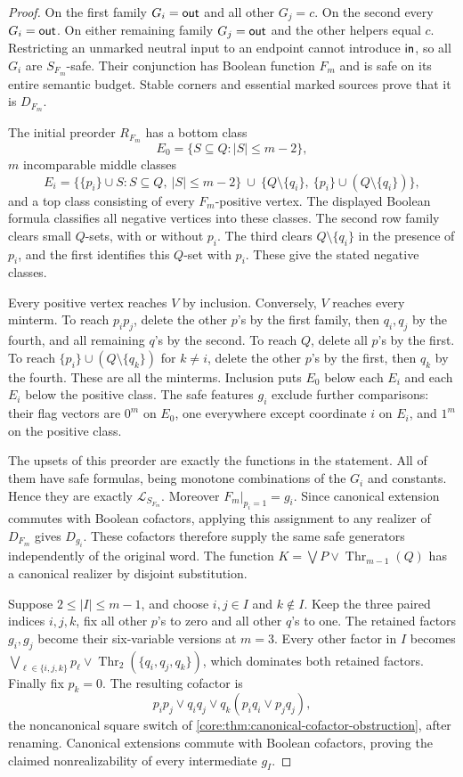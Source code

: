 \begin{proof}
On the first family $G_i=\mathsf{out}$ and all other $G_j=c$.
On the second every $G_i=\mathsf{out}$. On either remaining family $G_j=\mathsf{out}$
and the other helpers equal $c$. Restricting an unmarked neutral input
to an endpoint cannot introduce $\mathsf{in}$, so all $G_i$ are $S_{F_m}$-safe.
Their conjunction has Boolean function $F_m$ and is safe on its entire
semantic budget. Stable corners and essential marked sources prove that
it is $D_{F_m}$.

The initial preorder $R_{F_m}$ has a bottom class
\[
 E_0=\{S\subseteq Q:|S|\leq m-2\},
\]
$m$ incomparable middle classes
\[
 E_i=\{\{p_i\}\cup S:S\subseteq Q,\ |S|\leq m-2\}
       \ \cup\ \{Q\setminus\{q_i\},\ \{p_i\}\cup(Q\setminus\{q_i\})\},
\]
and a top class consisting of every $F_m$-positive vertex.
The displayed Boolean formula classifies all negative vertices into
these classes. The second row family clears small $Q$-sets, with or
without $p_i$. The third clears $Q\setminus\{q_i\}$ in the presence
of $p_i$, and the first identifies this $Q$-set with $p_i$.
These give the stated negative classes.

Every positive vertex reaches $V$ by inclusion. Conversely, $V$ reaches
every minterm. To reach $p_ip_j$, delete the other $p$'s by the first
family, then $q_i,q_j$ by the fourth, and all remaining $q$'s by the
second. To reach $Q$, delete all $p$'s by the first. To reach
$\{p_i\}\cup(Q\setminus\{q_k\})$ for $k\ne i$, delete the other
$p$'s by the first, then $q_k$ by the fourth. These are all the minterms.
Inclusion puts $E_0$ below each $E_i$ and each $E_i$ below the positive
class. The safe features $g_i$ exclude further comparisons: their flag
vectors are $0^m$ on $E_0$, one everywhere except coordinate $i$ on
$E_i$, and $1^m$ on the positive class.

The upsets of this preorder are exactly the functions in the statement.
All of them have safe formulas, being monotone combinations of the
$G_i$ and constants. Hence they are exactly $\mathcal L_{S_{F_m}}$.
Moreover $F_m|_{p_i=1}=g_i$. Since canonical extension commutes with
Boolean cofactors, applying this assignment to any realizer of $D_{F_m}$
gives $D_{g_i}$. These cofactors therefore supply the same safe generators
independently of the original word.
The function $K=\bigvee P\vee\operatorname{Thr}_{m-1}(Q)$ has a canonical
realizer by disjoint substitution.

Suppose $2\leq|I|\leq m-1$, and choose $i,j\in I$ and $k\notin I$.
Keep the three paired indices $i,j,k$, fix all other $p$'s to zero and
all other $q$'s to one. The retained factors $g_i,g_j$ become their
six-variable versions at $m=3$. Every other factor in $I$ becomes
$\bigvee_{\ell\in\{i,j,k\}}p_\ell\vee
\operatorname{Thr}_2(\{q_i,q_j,q_k\})$, which dominates both retained
factors. Finally fix $p_k=0$. The resulting cofactor is
\[
 p_ip_j\vee q_iq_j\vee q_k(p_iq_i\vee p_jq_j),
\]
the noncanonical square switch of
\cref{core:thm:canonical-cofactor-obstruction}, after renaming.
Canonical extensions commute with Boolean cofactors, proving the claimed
nonrealizability of every intermediate $g_I$.
\end{proof}

